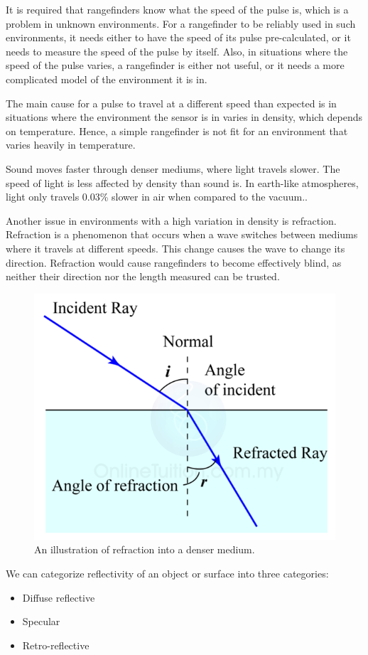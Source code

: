 It is required that rangefinders know what the speed of the pulse is, which is a problem in unknown environments. For a rangefinder to be reliably used in such environments, it needs either to have the speed of its pulse pre-calculated, or it needs to measure the speed of the pulse by itself. Also, in situations where the speed of the pulse varies, a rangefinder is either not useful, or it needs a more complicated model of the environment it is in.

The main cause for a pulse to travel at a different speed than expected is in situations where the environment the sensor is in varies in density, which depends on temperature\cite{refraction}. Hence, a simple rangefinder is not fit for an environment that varies heavily in temperature.

Sound moves faster through denser mediums, where light travels slower. The speed of light is less affected by density than sound is. In earth-like atmospheres, light only travels 0.03\% slower in air when compared to the vacuum.\cite{refraction}\cite{speedOfSound}.

Another issue in environments with a high variation in density is refraction. Refraction is a phenomenon that occurs when a wave switches between mediums where it travels at different speeds. This change causes the wave to change its direction\cite{snell}. Refraction would cause rangefinders to become effectively blind, as neither their direction nor the length measured can be trusted.

\begin{figure}[H]
	\centering
	\includegraphics[width=.4\linewidth]{images/refraction.png}
	\caption{An illustration of refraction into a denser medium.}
	\label{fig:refractionIMG}
\end{figure}

We can categorize reflectivity of an object or surface into three categories:\cite{reflectivity}

\begin{itemize}
	\item Diffuse reflective
	\item Specular
	\item Retro-reflective
\end{itemize}

